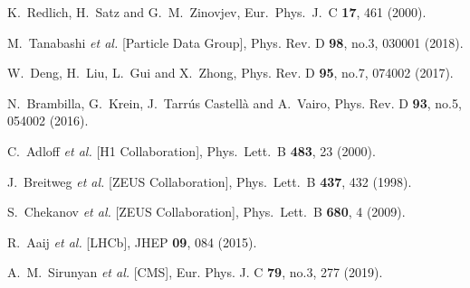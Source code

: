 \documentclass[prd,amsmath,%
twocolumn,floatfix,amssymb, preprintnumbers, nofootinbib, superscriptaddress]{revtex4}
\begin{document}
\begin{thebibliography}{99}
  K.~Redlich, H.~Satz and G.~M.~Zinovjev,
  Eur.\ Phys.\ J.\ C {\bf 17}, 461 (2000).

M.~Tanabashi \textit{et al.} [Particle Data Group],
Phys. Rev. D \textbf{98}, no.3, 030001 (2018). 


W.~Deng, H.~Liu, L.~Gui and X.~Zhong,
Phys. Rev. D \textbf{95}, no.7, 074002 (2017). 

N.~Brambilla, G.~Krein, J.~Tarrús Castellà and A.~Vairo,
Phys. Rev. D \textbf{93}, no.5, 054002 (2016).

 
  C.~Adloff {\it et al.} [H1 Collaboration],
  Phys.\ Lett.\ B {\bf 483}, 23 (2000).


  J.~Breitweg {\it et al.} [ZEUS Collaboration],
  Phys.\ Lett.\ B {\bf 437}, 432 (1998).
 

  S.~Chekanov {\it et al.} [ZEUS Collaboration],
  Phys.\ Lett.\ B {\bf 680}, 4 (2009).
 

R.~Aaij {\it et al.} [LHCb],
JHEP \textbf{09}, 084 (2015). 


A.~M.~Sirunyan {\it et al.} [CMS],
Eur. Phys. J. C \textbf{79}, no.3, 277 (2019). 



\end{thebibliography}
\end{document}
